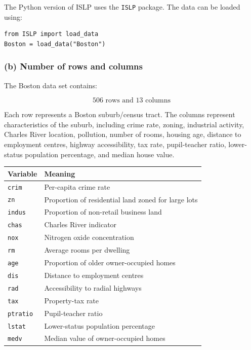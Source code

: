 \documentclass[12pt,a4paper]{article}
\begin{document}
The Python version of ISLP uses the \texttt{ISLP} package. The data can be
loaded using:

\begin{verbatim}
from ISLP import load_data
Boston = load_data("Boston")
\end{verbatim}

\subsubsection*{(b) Number of rows and columns}

The Boston data set contains:

\[
\boxed{506\text{ rows and }13\text{ columns}}
\]

Each row represents a Boston suburb/census tract. The columns represent
characteristics of the suburb, including crime rate, zoning, industrial
activity, Charles River location, pollution, number of rooms, housing age,
distance to employment centres, highway accessibility, tax rate,
pupil-teacher ratio, lower-status population percentage, and median house
value.

\begin{center}
\begin{tabular}{ll}
\toprule
Variable & Meaning\\
\midrule
\texttt{crim} & Per-capita crime rate\\
\texttt{zn} & Proportion of residential land zoned for large lots\\
\texttt{indus} & Proportion of non-retail business land\\
\texttt{chas} & Charles River indicator\\
\texttt{nox} & Nitrogen oxide concentration\\
\texttt{rm} & Average rooms per dwelling\\
\texttt{age} & Proportion of older owner-occupied homes\\
\texttt{dis} & Distance to employment centres\\
\texttt{rad} & Accessibility to radial highways\\
\texttt{tax} & Property-tax rate\\
\texttt{ptratio} & Pupil-teacher ratio\\
\texttt{lstat} & Lower-status population percentage\\
\texttt{medv} & Median value of owner-occupied homes\\
\bottomrule
\end{tabular}
\end{center}
\end{document}
